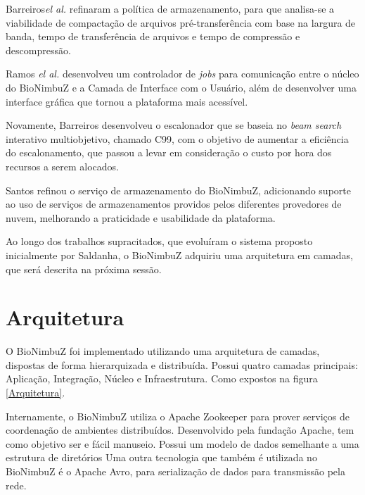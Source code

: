 Barreiros\textit{el al.}\cite{BioNimbuZ_BioCirrus} refinaram a política de armazenamento, para que analisa-se a viabilidade de compactação de arquivos pré-transferência com base na largura de banda, tempo de transferência de arquivos e tempo de compressão e descompressão.

Ramos \textit{el al.}\cite{BioNimbuZ_Ramos} desenvolveu um controlador de \textit{jobs} para comunicação entre o núcleo do BioNimbuZ e a Camada de Interface com o Usuário, além de desenvolver uma interface gráfica que tornou a plataforma mais acessível.

Novamente, Barreiros\cite{BioNimbuZ_Willian_C99} desenvolveu o escalonador que se baseia no \textit{beam search} interativo multiobjetivo, chamado C99, com o objetivo de aumentar a eficiência do escalonamento, que passou a levar em consideração o custo por hora dos recursos a serem alocados.

Santos\cite{BioNimbuZ_Santos} refinou o serviço de armazenamento do BioNimbuZ, adicionando suporte ao uso de serviços de armazenamentos providos pelos diferentes provedores de nuvem, melhorando a praticidade e usabilidade da plataforma.

Ao longo dos trabalhos supracitados, que evoluíram o sistema proposto inicialmente por Saldanha\cite{Saldanha_BioNimbus}, o BioNimbuZ adquiriu uma arquitetura em camadas, que será descrita na próxima sessão.

\section{Arquitetura}
O BioNimbuZ foi implementado utilizando uma arquitetura de camadas, dispostas de forma hierarquizada e distribuída. Possui quatro camadas principais: Aplicação, Integração, Núcleo e Infraestrutura. Como expostos na figura \ref{Arquitetura}.

Internamente, o BioNimbuZ utiliza o Apache Zookeeper\cite{Zookeeper} para prover serviços de coordenação de ambientes distribuídos. Desenvolvido pela fundação Apache\cite{Apache}, tem como objetivo ser e fácil manuseio. Possui um modelo de dados semelhante a uma estrutura de diretórios
Uma outra tecnologia que também é utilizada no BioNimbuZ é o Apache Avro\cite{Avro}, para serialização de dados para transmissão pela rede.


